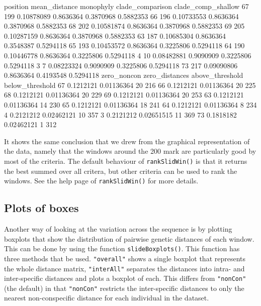 \documentclass{article}
\newcommand{\fun}[1]{\texttt{#1}}
\begin{document}
\begin{Routput}
   position mean_distance monophyly clade_comparison clade_comp_shallow
67      199    0.10878089 0.8636364        0.3870968          0.5882353
66      196    0.10733553 0.8636364        0.3870968          0.5882353
68      202    0.10581874 0.8636364        0.3870968          0.5882353
69      205    0.10287159 0.8636364        0.3870968          0.5882353
63      187    0.10685304 0.8636364        0.3548387          0.5294118
65      193    0.10453572 0.8636364        0.3225806          0.5294118
64      190    0.10446778 0.8636364        0.3225806          0.5294118
4        10    0.08482881 0.9090909        0.3225806          0.5294118
3         7    0.08223324 0.9090909        0.3225806          0.5294118
73      217    0.09090806 0.8636364        0.4193548          0.5294118
   zero_noncon zero_distances above_threshold below_threshold
67   0.1212121     0.01136364              20             216
66   0.1212121     0.01136364              20             225
68   0.1212121     0.01136364              20             229
69   0.1212121     0.01136364              20             253
63   0.1212121     0.01136364              14             230
65   0.1212121     0.01136364              18             241
64   0.1212121     0.01136364               8             234
4    0.2121212     0.02462121              10             357
3    0.2121212     0.02651515              11             369
73   0.1818182     0.02462121               1             312
\end{Routput}

It shows the same conclusion that we drew from the graphical representation of the data, namely that the windows around the 200 mark are particularly good by most of the criteria. The default behaviour of \fun{rankSlidWin()} is that it returns the best summed over all critera, but other criteria can be used to rank the windows. See the help page of \fun{rankSlidWin()} for more details.

\subsection{Plots of boxes}
Another way of looking at the variation across the sequence is by plotting boxplots that show the distribution of pairwise genetic distances of each window. This can be done by using the function \fun{slideBoxplots()}. This function has three methods that be used. \fun{"overall"} shows a single boxplot that represents the whole distance matrix, \fun{"interAll"} separates the distances into intra- and inter-specific distances and plots a boxplot of each. This differs from \fun{"nonCon"} (the default) in that \fun{"nonCon"} restricts the inter-specific distances to only the nearest non-conspecific distance for each individual in the dataset.
\end{document}
